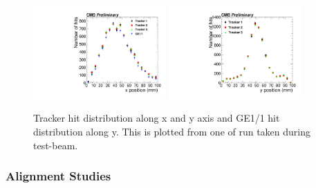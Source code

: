 \begin{figure}[!htbp]
\centering
\includegraphics[width=0.45\textwidth]{figures/GEM/Tracker_Hit_position_Run1644_x.pdf}%
\includegraphics[width=0.45\textwidth]{figures/GEM/Tracker_Hit_position_Run1644_y.pdf}
\caption{Tracker hit distribution along x and y axis and GE1/1 hit distribution along y. This is plotted from one of run taken during test-beam.}
\label{HitPosXaxis}
\end{figure}

\subsubsection{Alignment Studies}

